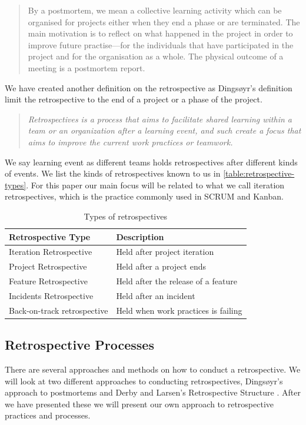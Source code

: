 \begin{quote}
By a postmortem, we mean a collective learning activity which
can be organised for projects either when they end a phase or
are terminated. The main motivation is to reflect on what happened
in the project in order to improve future practise—for the
individuals that have participated in the project and for the organisation
as a whole. The physical outcome of a meeting is a
postmortem report.
\end{quote}

We have created another definition on the retrospective as Dingsøyr's definition limit the retrospective to the end of a project or a phase of the project. 

\begin{quote}
	\textit{Retrospectives is a process that aims to facilitate shared learning within a team or an organization after a learning event, and such create a focus that aims to improve the current work practices or teamwork.}
\end{quote}

We say learning event as different teams holds retrospectives after different kinds of events. We list the kinds of retrospectives known to us in \autoref{table:retrospective-types}. For this paper our main focus will be related to what we call iteration retrospectives, which is the practice commonly used in SCRUM and Kanban. 

\begin{table}[h]
	\begin{center}
		\caption{Types of retrospectives}
		\label{table:retrospective-types}
		\begin{tabular}{l l}
			\hline
			Retrospective Type & Description \\
			\hline
			Iteration Retrospective & Held after project iteration \\
			Project Retrospective & Held after a project ends \\
			Feature Retrospective & Held after the release of a feature \\
			Incidents Retrospective & Held after an incident \\
			Back-on-track retrospective & Held when work practices is failing \\
			\hline
		\end{tabular}
	\end{center}
\end{table}



\subsection{Retrospective Processes}
There are several approaches and methods on how to conduct a retrospective. We will look at two different approaches to conducting retrospectives, Dingsøyr's \cite{Dingsoyr2004} approach to postmortems and Derby and Larsen's Retrospective Structure \cite{Larsen2006}. After we have presented these we will present our own approach to retrospective practices and processes. 


